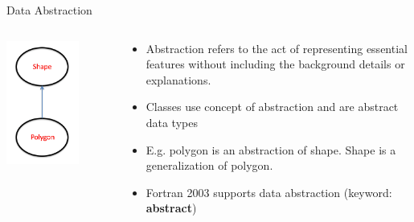 \documentclass[11pt]{beamer}
\begin{document}
\begin{frame}{Data Abstraction}

\begin{columns}

 \begin{column}{0.38\textwidth}
        
\begin{center} 
  \includegraphics[width=0.7\textwidth]{../../shared/abstraction.png} 
\end{center} 

 \end{column}
  
  \begin{column}{0.7\textwidth}
    \begin{itemize}
        \item Abstraction refers to the act of representing essential features without including the background details or explanations.
        \item Classes use concept of abstraction and are abstract data types
	\item E.g. polygon is an abstraction of shape. Shape is a generalization of polygon.
	\item Fortran 2003 supports data abstraction (keyword: \textbf{abstract})
    \end{itemize}

  \end{column}
\end{columns}

\end{frame}
\end{document}
